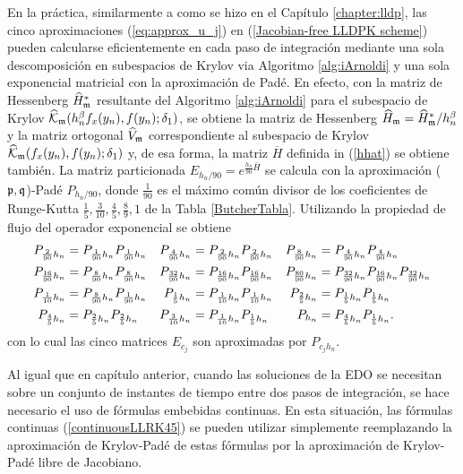 En la práctica, similarmente a como se hizo en el Capítulo \ref{chapter:lldp}, las cinco aproximaciones (\ref{eq:approx_u_j}) en (\ref{Jacobian-free LLDPK scheme}) pueden calcularse eficientemente en cada paso de integración mediante una sola descomposición en subespacios de Krylov via Algoritmo \ref{alg:iArnoldi} y una sola exponencial matricial con la aproximación de Padé. En efecto, con la matriz de Hessenberg $\widehat{H}^*_{\mathfrak{m}}$ resultante del Algoritmo \ref{alg:iArnoldi} para el subespacio de Krylov $\widehat{\mathcal{K}}_{\mathfrak{m}}(h_n^\beta f_x(y_n),f(y_n);\delta_1)$, se obtiene la matriz de Hessenberg $\widehat{H}_{\mathfrak{m}}=\widehat{H}^*_{\mathfrak{m}}/h_n^{\beta}$ y la matriz ortogonal $\widehat{V}_{\mathfrak{m}}$ correspondiente al subespacio de Krylov  $\widehat{\mathcal{K}}_{\mathfrak{m}}(f_x(y_n),f(y_n);\delta_1)$ y, de esa forma, la matriz $\overline{H}$ definida in (\ref{hhat}) se obtiene también. La matriz particionada $E_{h_n/90}=e^{\frac{h_n}{90}\overline{H}}$ se calcula con la aproximación ($\mathfrak{p},\mathfrak{q}$)-Padé $P_{h_n/90}$, donde $\frac{1}{ 90}$ es el máximo común divisor de los coeficientes de Runge-Kutta $\frac{1}{5},\frac{3}{10},\frac{4}{5},\frac{8}{9} ,1$ de la Tabla \ref{ButcherTabla}. Utilizando la propiedad de flujo del operador exponencial se obtiene
\begin{align}
P_{\frac{2}{90}h_{n}}& =P_{\frac{1}{90}h_{n}}P_{\frac{1}{90}h_{n}} & P_{%
	\frac{4}{90}h_{n}}& =P_{\frac{2}{90}h_{n}}P_{\frac{2}{90}h_{n}} & P_{\frac{8%
	}{90}h_{n}}& =P_{\frac{4}{90}h_{n}}P_{\frac{4}{90}h_{n}}  \notag \\
P_{\frac{16}{90}h_{n}}& =P_{\frac{8}{90}h_{n}}P_{\frac{8}{90}h_{n}} & P_{%
	\frac{32}{90}h_{n}}& =P_{\frac{16}{90}h_{n}}P_{\frac{16}{90}h_{n}} & P_{%
	\frac{80}{90}h_{n}}& =P_{\frac{32}{90}h_{n}}P_{\frac{16}{90}h_{n}}P_{\frac{32%
	}{90}h_{n}}  \label{flow2} \\
P_{\frac{1}{10}h_{n}}& =P_{\frac{8}{90}h_{n}}P_{\frac{1}{90}h_{n}} & P_{%
	\frac{1}{5}h_{n}}& =P_{\frac{1}{10}h_{n}}P_{\frac{1}{10}h_{n}} & P_{\frac{2}{%
		5}h_{n}}& =P_{\frac{1}{5}h_{n}}P_{\frac{1}{5}h_{n}}  \notag \\
P_{\frac{4}{5}h_{n}}& =P_{\frac{2}{5}h_{n}}P_{\frac{2}{5}h_{n}} & P_{\frac{3%
	}{10}h_{n}}& =P_{\frac{1}{10}h_{n}}P_{\frac{1}{5}h_{n}} & P_{h_{n}}& =P_{%
	\frac{4}{5}h_{n}}P_{\frac{1}{5}h_{n}}.  \notag
\end{align}
con lo cual las cinco matrices $E_{c_j}$ son aproximadas por $P_{c_j h_n}$.

Al igual que en capítulo anterior, cuando las soluciones de la EDO se necesitan sobre un conjunto de instantes de tiempo entre dos pasos de integración, se hace necesario el uso de fórmulas embebidas continuas.  En esta situación, las fórmulas continuas (\ref{continuousLLRK45}) se pueden utilizar simplemente reemplazando la aproximación de Krylov-Padé de estas fórmulas por la aproximación de Krylov-Padé libre de Jacobiano.


